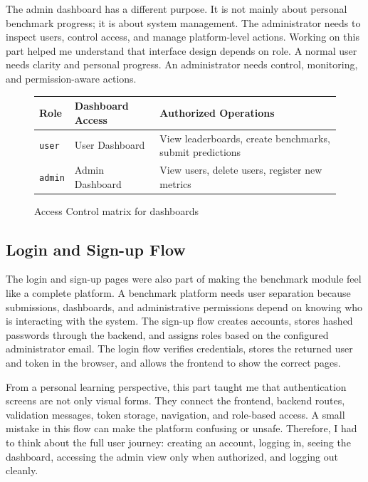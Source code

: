 \documentclass[12pt,a4paper,oneside]{report}
\begin{document}
The admin dashboard has a different purpose. It is not mainly about personal benchmark progress; it is about system management. The administrator needs to inspect users, control access, and manage platform-level actions. Working on this part helped me understand that interface design depends on role. A normal user needs clarity and personal progress. An administrator needs control, monitoring, and permission-aware actions.

\begin{figure}[H]
\centering
\begin{minipage}{0.65\textwidth}
\small
\renewcommand{\arraystretch}{1.15}
\begin{tabular}{|l|l|p{3.5cm}|}
\hline
\textbf{Role} & \textbf{Dashboard Access} & \textbf{Authorized Operations} \\ \hline
\texttt{user} & User Dashboard & View leaderboards, create benchmarks, submit predictions \\ \hline
\texttt{admin} & Admin Dashboard & View users, delete users, register new metrics \\ \hline
\end{tabular}
\end{minipage}
\caption{Access Control matrix for dashboards}
\label{fig:admin_dashboard_logic}
\end{figure}

\subsection{Login and Sign-up Flow}
\noindent The login and sign-up pages were also part of making the benchmark module feel like a complete platform. A benchmark platform needs user separation because submissions, dashboards, and administrative permissions depend on knowing who is interacting with the system. The sign-up flow creates accounts, stores hashed passwords through the backend, and assigns roles based on the configured administrator email. The login flow verifies credentials, stores the returned user and token in the browser, and allows the frontend to show the correct pages.

From a personal learning perspective, this part taught me that authentication screens are not only visual forms. They connect the frontend, backend routes, validation messages, token storage, navigation, and role-based access. A small mistake in this flow can make the platform confusing or unsafe. Therefore, I had to think about the full user journey: creating an account, logging in, seeing the dashboard, accessing the admin view only when authorized, and logging out cleanly.
\end{document}
